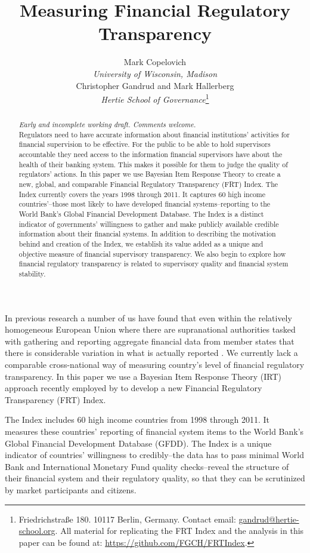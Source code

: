 \documentclass[a4paper]{article}
\title{Measuring Financial Regulatory Transparency}
\author{Mark Copelovich \\ \emph{University of Wisconsin, Madison} \\[0.5cm] Christopher Gandrud and Mark Hallerberg \\ 
    {\emph{Hertie School of Governance}}\footnote{Friedrichstra{\ss}e 180. 10117 Berlin, Germany. Contact email: \href{mailto:gandrud@hertie-school.org}{gandrud@hertie-school.org}. All material for replicating the FRT Index and the analysis in this paper can be found at: \url{https://github.com/FGCH/FRTIndex}.}}
\begin{document}
\maketitle

\begin{abstract}
\noindent \emph{Early and incomplete working draft. Comments welcome.} \\
    Regulators need to have accurate information about financial institutions' activities for financial supervision to be effective. For the public to be able to hold supervisors accountable they need access to the information financial supervisors have about the health of their banking system. This makes it possible for them to judge the quality of regulators' actions. In this paper we use Bayesian Item Response Theory to create a new, global, and comparable Financial Regulatory Transparency (FRT) Index. The Index currently covers the years 1998 through 2011. It captures 60 high income countries'--those most likely to have developed financial systems--reporting to the World Bank's Global Financial Development Database. The Index is a distinct indicator of governments' willingness to gather and make publicly available credible information about their financial systems. In addition to describing the motivation behind and creation of the Index, we establish its value added as a unique and objective measure of financial supervisory transparency. We also begin to explore how financial regulatory transparency is related to supervisory quality and financial system stability.  
\end{abstract}

In previous research a number of us have found that even within the relatively homogeneous European Union where there are supranational authorities tasked with gathering and reporting aggregate financial data from member states that there is considerable variation in what is actually reported \cite[see][]{Gandrud2014a}. We currently lack a comparable cross-national way of measuring country's level of financial regulatory transparency. In this paper we use a Bayesian Item Response Theory (IRT) approach recently employed by \cite{Hollyer2014} to develop a new Financial Regulatory Transparency (FRT) Index. 

The Index includes 60 high income countries from 1998 through 2011. It measures these countries' reporting of financial system items to the World Bank's Global Financial Development Database (GFDD). The Index is a unique indicator of countries' willingness to credibly--the data has to pass minimal World Bank and International Monetary Fund quality checks--reveal the structure of their financial system and their regulatory quality, so that they can be scrutinized by market participants and citizens.
\end{document}
